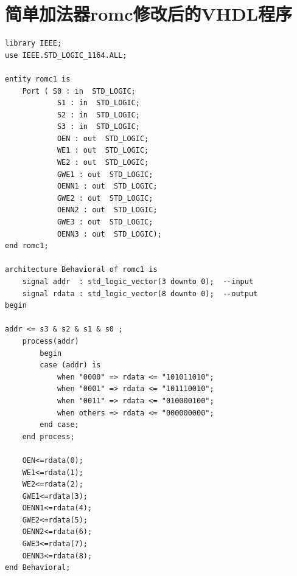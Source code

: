 \documentclass[a4paper]{ctexart}
\begin{document}
\section{简单加法器romc修改后的VHDL程序}\label{简单加法器romc程序}
\begin{lstlisting}
library IEEE;
use IEEE.STD_LOGIC_1164.ALL;

entity romc1 is
	Port ( S0 : in  STD_LOGIC;
			S1 : in  STD_LOGIC;
			S2 : in  STD_LOGIC;
			S3 : in  STD_LOGIC;
			OEN : out  STD_LOGIC;
			WE1 : out  STD_LOGIC;
			WE2 : out  STD_LOGIC;
			GWE1 : out  STD_LOGIC;
			OENN1 : out  STD_LOGIC;
			GWE2 : out  STD_LOGIC;
			OENN2 : out  STD_LOGIC;
			GWE3 : out  STD_LOGIC;
			OENN3 : out  STD_LOGIC);
end romc1;

architecture Behavioral of romc1 is
	signal addr  : std_logic_vector(3 downto 0);  --input
	signal rdata : std_logic_vector(8 downto 0);  --output
begin

addr <= s3 & s2 & s1 & s0 ;
	process(addr)
		begin
		case (addr) is
			when "0000" => rdata <= "101011010";
			when "0001" => rdata <= "101110010";
			when "0011" => rdata <= "010000100";
			when others => rdata <= "000000000";
		end case;
	end process;
		
	OEN<=rdata(0);
	WE1<=rdata(1);
	WE2<=rdata(2);
	GWE1<=rdata(3);
	OENN1<=rdata(4);
	GWE2<=rdata(5);
	OENN2<=rdata(6);
	GWE3<=rdata(7);
	OENN3<=rdata(8);
end Behavioral;	
\end{lstlisting}

\newpage
\end{document}
